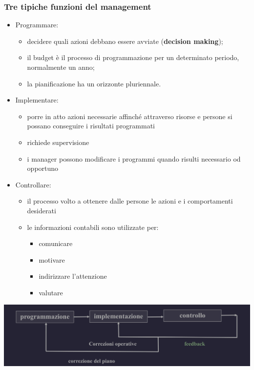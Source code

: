 \documentclass{article}
\begin{document}
\subsubsection{Tre tipiche funzioni del management}
\begin{itemize}
    \item Programmare:
    \begin{itemize}
        \item decidere quali azioni debbano essere avviate (\textbf{decision making});
        \item il budget è il processo di programmazione per un determinato periodo, normalmente un anno;
        \item la pianificazione ha un orizzonte pluriennale.
    \end{itemize}
    \item Implementare:
    \begin{itemize}
        \item porre in atto azioni
        necessarie affinché
        attraverso risorse e
        persone si possano
        conseguire i risultati
        programmati
        \item richiede supervisione
        \item i manager possono
        modificare i programmi
        quando risulti necessario
        od opportuno
    \end{itemize}
    \item Controllare:
    \begin{itemize}
        \item il processo volto a
        ottenere dalle persone le
        azioni e i comportamenti
        desiderati
        \item le informazioni contabili
        sono utilizzate per:
        \begin{itemize}
            \item comunicare
            \item motivare
            \item indirizzare l'attenzione
            \item valutare
        \end{itemize}
    \end{itemize}
\end{itemize}
\begin{center}
    \includegraphics[scale=0.3]{Image/FunzioniManag_1.png}
\end{center} 
\end{document}
